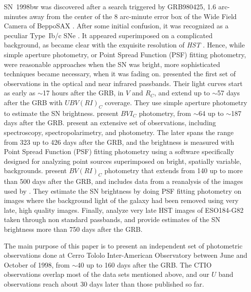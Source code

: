 \documentclass[12pt,preprint]{aastex}
\begin{document}
SN~1998bw was discovered after a search triggered by GRB980425, 1.6 arc-minutes
away from the center of the 8 arc-minute error box of the Wide Field Camera of
BeppoSAX \citep{getal98}.
%
After some initial confusion, it was recognized as a peculiar Type~Ib/c SNe
\citep{setal98}.
%
It appeared superimposed on a complicated background, as became clear with the
exquisite resolution of {\em HST} \citep{petal01}.
%
Hence, while simple aperture photometry, or Point Spread
Function (PSF) fitting photometry, were reasonable approaches when the SN was bright,
more sophisticated techniques became necessary, when it was fading on.
%
\citet{getal98} presented the first set of observations in the
optical and near infrared passbands.
%
Their light curves start as early as $\sim$17 hours after the GRB, in $V$ and $R_C$, and
extend up to $\sim$57 days after the GRB with $UBV(RI)_C$ coverage. They use simple aperture photometry
to estimate the SN brightness.
%
\citet{mands99} present $BVI_C$ photometry, from $\sim$64 up to $\sim$187 days after the GRB.
%
\citet{petal01} present an extensive set of observations, including spectroscopy, spectropolarimetry, and photometry.
%
The later spans the range from 323 up to 426 days after the GRB, and the brightness is measured with Point Spread
Function (PSF) fitting photometry using a software specifically designed for analyzing point sources superimposed
on bright, spatially variable, backgrounds.
%
\citet{soetal02} present $BV(RI)_C$ photometry that extends from 140 up to more than 500 days after the GRB, and
includes data from a reanalysis of the images used by \citet{petal01}. They
estimate the SN brightness by doing PSF fitting photometry on images where the background light
of the galaxy had been removed using very late, high quality images.
%
Finally, \citet{fetal00} analyze very late HST images of ESO184-G82 taken through non standard passbands, and provide
estimates of the SN brightness more than 750 days after the GRB.

The main purpose of this paper is to present an independent set of photometric
observations done at Cerro Tololo Inter-American Observatory between June and
October of 1998, from $\sim$40 up to 160 days after the GRB.
%
The CTIO observations overlap most of the data sets mentioned above, and
our $U$ band observations reach about 30 days later than those published so far.
\end{document}
